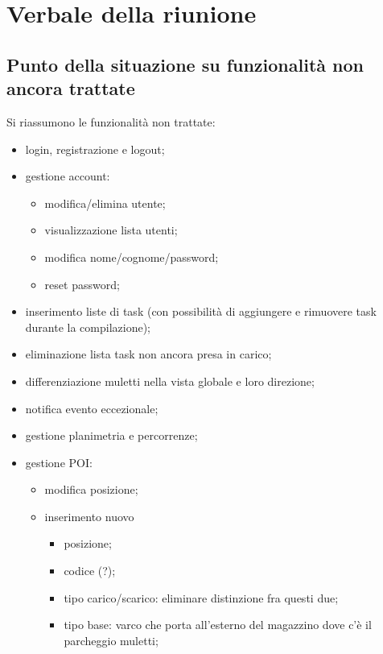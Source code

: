 \section{Verbale della riunione}

\subsection{Punto della situazione su funzionalità non ancora trattate}
    Si riassumono le funzionalità non trattate:
    \begin{itemize}
        \item login, registrazione e logout;
        \item gestione account:
            \begin{itemize}
                \item modifica/elimina utente;
                \item visualizzazione lista utenti;
                \item modifica nome/cognome/password;
                \item reset password;
            \end{itemize}
        \item inserimento liste di task (con possibilità di aggiungere e rimuovere task durante la compilazione);
        \item eliminazione lista task non ancora presa in carico;
        \item differenziazione muletti nella vista globale e loro direzione;
        \item notifica evento eccezionale;
        \item gestione planimetria e percorrenze;
        \item gestione POI:
        \begin{itemize}
            \item modifica posizione;
            \item inserimento nuovo
            \begin{itemize}
                \item posizione;
                \item codice (?);
                \item tipo carico/scarico: eliminare distinzione fra questi due;
                \item tipo base: varco che porta all’esterno del magazzino dove c'è il parcheggio muletti;
            \end{itemize}

\end{itemize}
\end{itemize}
